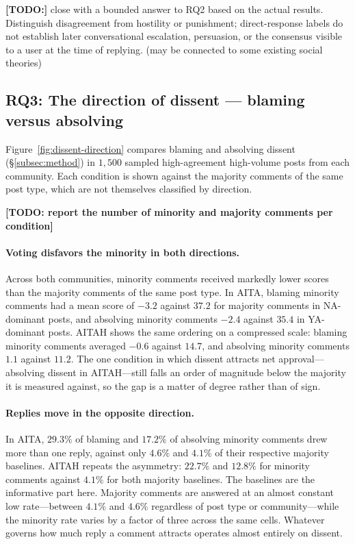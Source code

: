 \textbf{[TODO:]} close with a bounded answer to RQ2 based on the actual results.
Distinguish disagreement from hostility or punishment; direct-response labels
do not establish later conversational escalation, persuasion, or the consensus
visible to a user at the time of replying. (may be connected to some existing social theories)



\subsection{RQ3: The direction of dissent --- blaming versus absolving}
\label{subsec:res-direction}

Figure~\ref{fig:dissent-direction} compares blaming and absolving dissent
(\S\ref{subsec:method}) in $1{,}500$ sampled high-agreement high-volume posts from
each community. Each condition is shown against the majority comments of the
same post type, which are not themselves classified by direction.

\textbf{[TODO: report the number of minority and majority comments per
condition]}

\paragraph{Voting disfavors the minority in both directions.}
Across both communities, minority comments received markedly lower scores than
the majority comments of the same post type. In AITA, blaming minority
comments had a mean score of $-3.2$ against $37.2$ for majority comments in
NA-dominant posts, and absolving minority comments $-2.4$ against $35.4$ in
YA-dominant posts. AITAH shows the same ordering on a compressed scale:
blaming minority comments averaged $-0.6$ against $14.7$, and absolving
minority comments $1.1$ against $11.2$. The one condition in which dissent
attracts net approval---absolving dissent in AITAH---still falls an order of
magnitude below the majority it is measured against, so the gap is a matter of
degree rather than of sign.

\paragraph{Replies move in the opposite direction.}
In AITA, $29.3\%$ of blaming and $17.2\%$ of absolving minority comments drew
more than one reply, against only $4.6\%$ and $4.1\%$ of their respective
majority baselines. AITAH repeats the asymmetry: $22.7\%$ and $12.8\%$ for
minority comments against $4.1\%$ for both majority baselines. The baselines
are the informative part here. Majority comments are answered at an almost
constant low rate---between $4.1\%$ and $4.6\%$ regardless of post type or
community---while the minority rate varies by a factor of three across the same
cells. Whatever governs how much reply a comment attracts operates almost
entirely on dissent.

